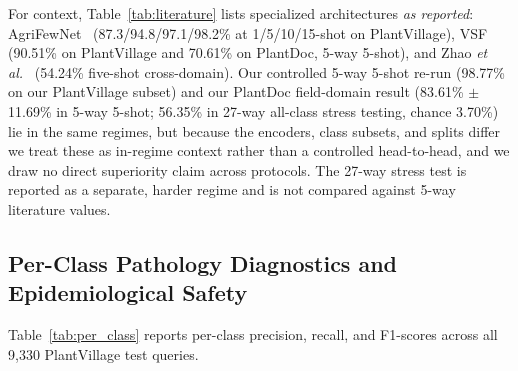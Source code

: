 \documentclass[preprint,12pt]{elsarticle}
\begin{document}
For context, Table~\ref{tab:literature} lists specialized architectures \emph{as reported}: AgriFewNet~\cite{babu2025agrifewnet} (87.3/94.8/97.1/98.2\% at 1/5/10/15-shot on PlantVillage), VSF~\cite{zhou2026vsf} (90.51\% on PlantVillage and 70.61\% on PlantDoc, 5-way 5-shot), and Zhao \textit{et al.}~\cite{zhao2026lightweight} (54.24\% five-shot cross-domain). Our controlled 5-way 5-shot re-run (98.77\% on our PlantVillage subset) and our PlantDoc field-domain result (83.61\% $\pm$ 11.69\% in 5-way 5-shot; 56.35\% in 27-way all-class stress testing, chance 3.70\%) lie in the same regimes, but because the encoders, class subsets, and splits differ we treat these as in-regime context rather than a controlled head-to-head, and we draw no direct superiority claim across protocols. The 27-way stress test is reported as a separate, harder regime and is not compared against 5-way literature values.

\subsection{Per-Class Pathology Diagnostics and Epidemiological Safety}
\label{sec:per_class}
Table~\ref{tab:per_class} reports per-class precision, recall, and F1-scores across all 9,330 PlantVillage test queries.
\end{document}
